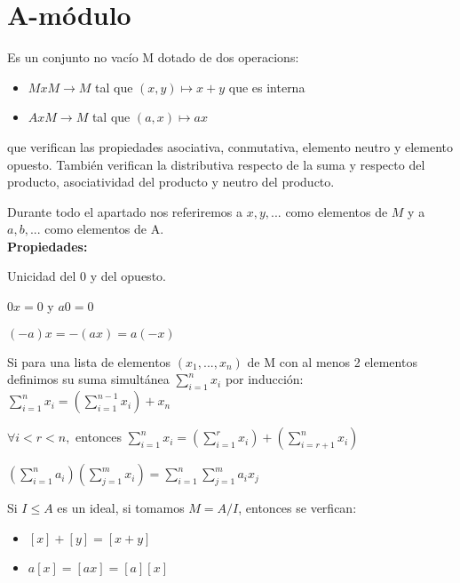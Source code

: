 \section{A-módulo}
\begin{ndef}[A-módulo]
	Es un conjunto no vacío M dotado de dos operacions:
	\begin{itemize}
	\item $MxM \to M$ tal que $(x,y) \mapsto x+y$ que es interna
	\item $Ax M \to M$ tal que $(a,x) \mapsto ax$
\end{itemize}
que verifican las propiedades asociativa, conmutativa, elemento neutro y elemento opuesto. También verifican la distributiva respecto de la suma y respecto del producto, asociatividad del producto y neutro del producto.

\end{ndef}
Durante todo el apartado nos referiremos a $x, y,...$ como elementos de $M$ y a $a, b, ...$ como elementos de A.\\
\textbf{Propiedades:}
\begin{nlist}
	\item Unicidad del 0 y del opuesto.
	\item $0x = 0$ y $a0 = 0$
	\item $(-a)x = -(ax) = a(-x)$
	\item Si para una lista de elementos $(x_1,...,x_n)$ de M con al menos 2 elementos definimos su suma simultánea $\sum_{i=1}^n x_i$ por inducción:$ \sum_{i=1}^n x_i = (\sum_{i=1}^{n-1}x_i) +x_n$
	\item $\forall i < r < n,$ entonces $\sum_{i=1}^n x_i = (\sum_{i=1}^{r}x_i) + (\sum_{i=r+1}^{n}x_i) $
	\item $ (\sum_{i=1}^n a_i)(\sum_{j=1}^m x_i) = \sum_{i=1}^n \sum_{j=1}^m a_ix_j$
\end{nlist}

Si $I \leq A$ es un ideal, si tomamos $M= A/I$, entonces se verfican:
\begin{itemize}
	\item $[x]+[y] = [x+y]$
	\item $a[x] = [ax] = [a][x]$
\end{itemize}

